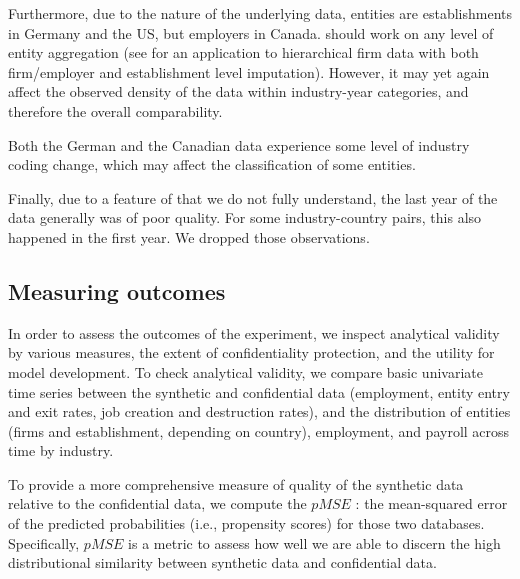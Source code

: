 Furthermore, due to the nature of the underlying data, entities are establishments in Germany and the US, but employers in Canada. \SynLBD{} should work on any level of entity aggregation (see \citet{RePEc:cen:wpaper:14-12} for an application to hierarchical firm data with both firm/employer and establishment level imputation). However, it may yet again affect the observed density of the data within industry-year categories, and therefore the overall comparability. 

Both the German and the Canadian data experience some level of industry coding change, which may affect the classification of some entities. 

Finally, due to a feature of \SynLBD{} that we do not fully understand, the last year of the data generally was of poor quality. For some industry-country pairs, this also happened in the first year. We dropped those observations. 

\subsection{Measuring outcomes}

In order to assess the outcomes of the experiment, we inspect analytical validity by various measures, the extent of confidentiality protection, and the utility for model development. To check analytical validity, we compare basic univariate time series between the synthetic and confidential data (employment, entity entry and exit rates, job creation and destruction rates), and the distribution of entities (firms and establishment, depending on country),  employment, and payroll across time by industry. 

To provide a more comprehensive measure of  quality of the synthetic data relative to the confidential data, we compute the $pMSE$ \parencite[propensity score mean-squared error,][]{Woo_Reiter_Oganian_Karr_2009,SnokeSlavkovic2018,Snoke_RSSA2018}: the mean-squared error of the predicted probabilities (i.e., propensity scores) for those two databases. Specifically, $pMSE$ is a metric to assess how well we are able to discern the high distributional similarity between synthetic data and confidential data. 

